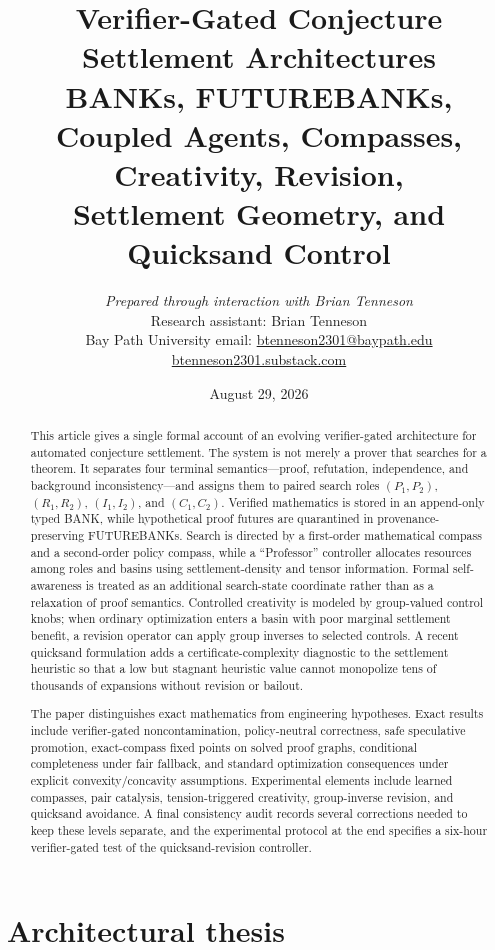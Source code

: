 \documentclass[11pt]{article}
\title{\textbf{Verifier-Gated Conjecture Settlement Architectures}\\[0.35em]
\large BANKs, FUTUREBANKs, Coupled Agents, Compasses, Creativity, Revision,\\Settlement Geometry, and Quicksand Control}
\author{\textit{Prepared through interaction with Brian Tenneson}\\[0.5em]
\normalsize Research assistant: Brian Tenneson\\
\normalsize Bay Path University email: \href{mailto:btenneson2301@baypath.edu}{btenneson2301@baypath.edu}\\
\normalsize \href{https://btenneson2301.substack.com}{btenneson2301.substack.com}}
\date{August 29, 2026}
\begin{document}
\maketitle

\begin{abstract}
This article gives a single formal account of an evolving verifier-gated architecture for automated conjecture settlement. The system is not merely a prover that searches for a theorem. It separates four terminal semantics---proof, refutation, independence, and background inconsistency---and assigns them to paired search roles $(P_1,P_2)$, $(R_1,R_2)$, $(I_1,I_2)$, and $(C_1,C_2)$. Verified mathematics is stored in an append-only typed BANK, while hypothetical proof futures are quarantined in provenance-preserving FUTUREBANKs. Search is directed by a first-order mathematical compass and a second-order policy compass, while a ``Professor'' controller allocates resources among roles and basins using settlement-density and tensor information. Formal self-awareness is treated as an additional search-state coordinate rather than as a relaxation of proof semantics. Controlled creativity is modeled by group-valued control knobs; when ordinary optimization enters a basin with poor marginal settlement benefit, a revision operator can apply group inverses to selected controls. A recent quicksand formulation adds a certificate-complexity diagnostic to the settlement heuristic so that a low but stagnant heuristic value cannot monopolize tens of thousands of expansions without revision or bailout.

The paper distinguishes exact mathematics from engineering hypotheses. Exact results include verifier-gated noncontamination, policy-neutral correctness, safe speculative promotion, exact-compass fixed points on solved proof graphs, conditional completeness under fair fallback, and standard optimization consequences under explicit convexity/concavity assumptions. Experimental elements include learned compasses, pair catalysis, tension-triggered creativity, group-inverse revision, and quicksand avoidance. A final consistency audit records several corrections needed to keep these levels separate, and the experimental protocol at the end specifies a six-hour verifier-gated test of the quicksand-revision controller.
\end{abstract}

\tableofcontents
\newpage

\section{Architectural thesis}
\end{document}
